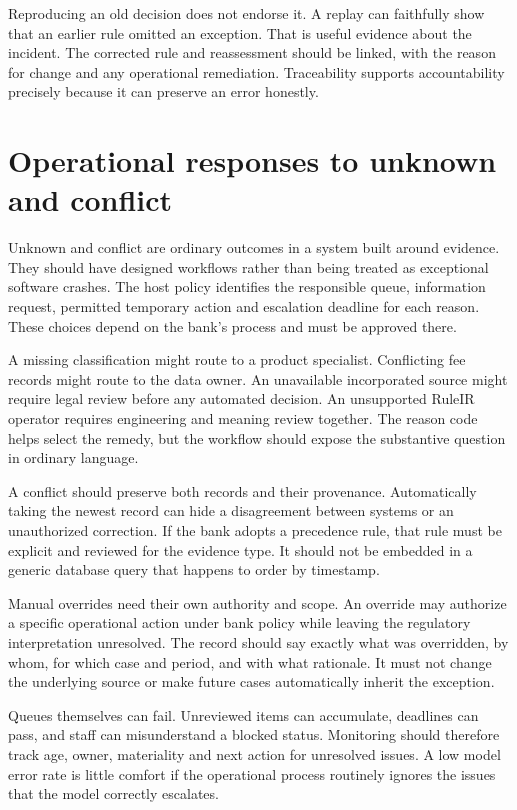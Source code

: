 Reproducing an old decision does not endorse it. A replay can faithfully show that
an earlier rule omitted an exception. That is useful evidence about the incident.
The corrected rule and reassessment should be linked, with the reason for change
and any operational remediation. Traceability supports accountability precisely
because it can preserve an error honestly.

\section{Operational responses to unknown and conflict}

Unknown and conflict are ordinary outcomes in a system built around evidence.
They should have designed workflows rather than being treated as exceptional
software crashes. The host policy identifies the responsible queue, information
request, permitted temporary action and escalation deadline for each reason.
These choices depend on the bank's process and must be approved there.

A missing classification might route to a product specialist. Conflicting fee
records might route to the data owner. An unavailable incorporated source might
require legal review before any automated decision. An unsupported RuleIR operator
requires engineering and meaning review together. The reason code helps select
the remedy, but the workflow should expose the substantive question in ordinary
language.

A conflict should preserve both records and their provenance. Automatically taking
the newest record can hide a disagreement between systems or an unauthorized
correction. If the bank adopts a precedence rule, that rule must be explicit and
reviewed for the evidence type. It should not be embedded in a generic database
query that happens to order by timestamp.

Manual overrides need their own authority and scope. An override may authorize a
specific operational action under bank policy while leaving the regulatory
interpretation unresolved. The record should say exactly what was overridden,
by whom, for which case and period, and with what rationale. It must not change
the underlying source or make future cases automatically inherit the exception.

Queues themselves can fail. Unreviewed items can accumulate, deadlines can pass,
and staff can misunderstand a blocked status. Monitoring should therefore track
age, owner, materiality and next action for unresolved issues. A low model error
rate is little comfort if the operational process routinely ignores the issues
that the model correctly escalates.


